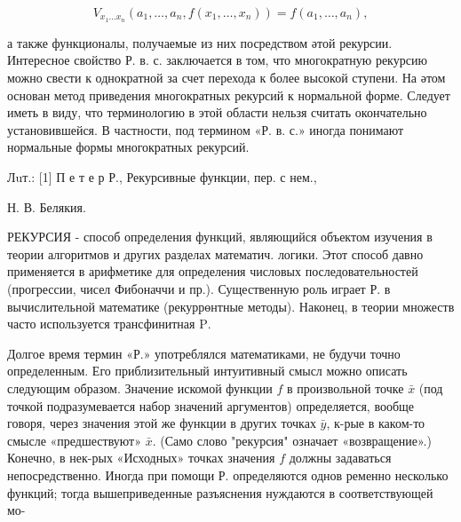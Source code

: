 \documentclass[10pt]{article}
\begin{document}
\[

V_{x_{1} \ldots x_{n}}\left(a_{1}, \ldots, a_{n}, f\left(x_{1}, \ldots, x_{n}\right)\right)=f\left(a_{1}, \ldots, a_{n}\right),

\]



а также функционалы, получаемые из них посредством әтой рекурсии. Интересное свойство Р. в. с. заключается в том, что многократную рекурсию можно свести к однократной за счет перехода к более высокой ступени. На әтом основан метод приведения многократных рекурсий к нормальной форме. Следует иметь в виду, что терминологию в этой области нельзя считать окончательно установившейся. В частности, под термином «Р. в. с.» иногда понимают нормальные формы многократных рекурсий.



Лuт.: [1] П е т е р Р., Рекурсивные функции, пер. с нем.,

Н. В. Белякия.



РЕКУРСИЯ - способ определения функций, являющийся объектом изучения в теории алгоритмов и других разделах математич. логики. Этот способ давно применяется в арифметике для определения числовых последовательностей (прогрессии, чисел Фибоначчи и пр.). Существенную роль играет Р. в вычислительной математике (рекуррөнтные методы). Наконец, в теории множеств часто используется трансфинитная $\mathrm{P}$.



Долгое время термин «Р.» употреблялся математиками, не будучи точно определенным. Его приблизительный интуитивный смысл можно описать следующим образом. Значение искомой функции $f$ в произвольной точке $\bar{x}$ (под точкой подразумевается набор значений аргументов) определяется, вообще говоря, через значения этой же функции в других точках $\bar{y}$, к-рые в каком-то смысле «предшествуют» $\bar{x}$. (Само слово "рекурсия" означает «возвращение».) Конечно, в нек-рых «Исходных» точках значения $f$ должны задаваться непосредственно. Иногда при помощи Р. определяются однов ременно несколько функций; тогда вышеприведенные разъяснения нуждаются в соответствующей мо-
\end{document}
